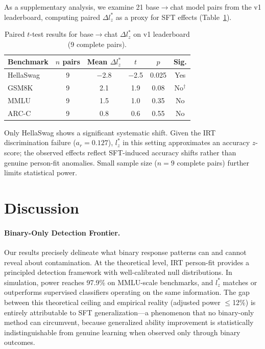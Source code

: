 \documentclass[11pt]{article}
\begin{document}
As a supplementary analysis, we examine 21 base$\to$chat model pairs from the v1 leaderboard, computing paired $\Delta l_z^*$ as a proxy for SFT effects (Table~\ref{tab:natural}).

\begin{table}[h]
\centering
\caption{Paired $t$-test results for base$\to$chat $\Delta l_z^*$ on v1 leaderboard (9 complete pairs).}
\label{tab:natural}
\begin{tabular}{lccccc}
\toprule
Benchmark & $n$ pairs & Mean $\Delta l_z^*$ & $t$ & $p$ & Sig. \\
\midrule
HellaSwag & 9 & $-$2.8 & $-$2.5 & 0.025 & Yes \\
GSM8K & 9 & 2.1 & 1.9 & 0.08 & No$^\dagger$ \\
MMLU & 9 & 1.5 & 1.0 & 0.35 & No \\
ARC-C & 9 & 0.8 & 0.6 & 0.55 & No \\
\bottomrule
\end{tabular}
\end{table}

Only HellaSwag shows a significant systematic shift. Given the IRT discrimination failure ($a_r = 0.127$), $l_z^*$ in this setting approximates an accuracy $z$-score; the observed effects reflect SFT-induced accuracy shifts rather than genuine person-fit anomalies. Small sample size ($n=9$ complete pairs) further limits statistical power.

\section{Discussion}
\label{sec:discussion}

\paragraph{Binary-Only Detection Frontier.} Our results precisely delineate what binary response patterns can and cannot reveal about contamination. At the theoretical level, IRT person-fit provides a principled detection framework with well-calibrated null distributions. In simulation, power reaches 97.9\% on MMLU-scale benchmarks, and $l_z^*$ matches or outperforms supervised classifiers operating on the same information. The gap between this theoretical ceiling and empirical reality (adjusted power $\leq$12\%) is entirely attributable to SFT generalization---a phenomenon that no binary-only method can circumvent, because generalized ability improvement is statistically indistinguishable from genuine learning when observed only through binary outcomes.
\end{document}
